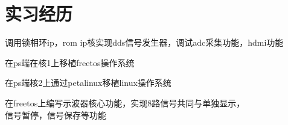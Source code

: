 \documentclass[]{deedy-resume-openfont}
\begin{document}
\begin{minipage}[t]{0.73\textwidth} 


\section{实习经历}
\sectionsep
{}
\vspace{\topsep}
\begin{tightemize}
    \item 调用锁相环ip，rom ip核实现dds信号发生器，调试adc采集功能，hdmi功能
    \item 在ps端在核1上移植freetos操作系统
    \item 在ps端核2上通过petalinux移植linux操作系统
    \item 在freetos上编写示波器核心功能，实现8路信号共同与单独显示，\\信号暂停，信号保存等功能
\end{tightemize}
\sectionsep





\end{minipage}
\end{document}

